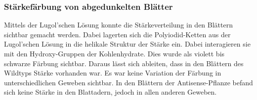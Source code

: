 \documentclass[10pt,a4paper]{article}
\begin{document}
	\subsubsection{Stärkefärbung von abgedunkelten Blätter}
	Mittels der Lugol’schen Lösung konnte die Stärkeverteilung in den Blättern sichtbar gemacht werden. Dabei lagerten sich die Polyiodid-Ketten aus der Lugol’schen Lösung in die helikale Struktur der Stärke ein. Dabei interagieren sie mit den Hydroxy-Gruppen der Kohlenhydrate. Dies wurde als violett bis schwarze Färbung sichtbar\cite{unterrichtsmaterial}. Daraus lässt sich ableiten, dass in den Blättern des Wildtyps Stärke vorhanden war. Es war keine Variation der Färbung in unterschiedlichen Geweben sichtbar. In den Blättern der Antisense-Pflanze befand sich keine Stärke in den Blattadern, jedoch in allen anderen Geweben.\\
\end{document}
